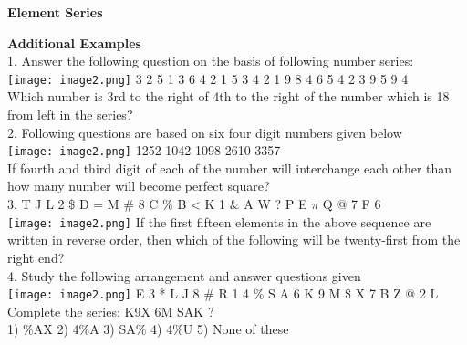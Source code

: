 \documentclass[
]{article}
\author{}
\date{}
\begin{document}
	
 

\begin{center}
	{\Large \textbf{ Element Series\\}}
\end{center}

\textbf{Additional Examples}\\

1. Answer the following question on the basis of following number series:\\
\texttt{[image: image2.png]}
3 2 5 1 3 6 4 2 1 5 3 4 2 1 9 8 4 6 5 4 2 3 9 5 9 4\\
Which number is 3rd to the right of 4th to the right of the number which is 18 from left in the series?\\

2. Following questions are based on six four digit numbers given below\\
\texttt{[image: image2.png]}
1252 1042 1098 2610 3357\\
If fourth and third digit of each of the number will interchange each other than how many number will become perfect square?\\

3. T J L 2 \$ D = M \# 8 C \% B < K 1 \& A W ? P E $\pi$ Q @ 7 F 6\\
\texttt{[image: image2.png]}
If the first fifteen elements in the above sequence are written in reverse order, then which of the following will be twenty-first from the right end?\\

4. Study the following arrangement and answer questions given\\
\texttt{[image: image2.png]}
E 3 * L J 8 \# R 1 4 \% S A \delta \hspace{1mm} 6\hspace{1mm} K\hspace{1mm} 9\hspace{1mm} M\hspace{1mm} \$\hspace{1mm} X\hspace{1mm} 7\hspace{1mm} \beta \hspace{1mm}B\hspace{1mm} Z\hspace{1mm} @\hspace{1mm} 2\hspace{1mm} L\\
Complete the series: K9X\hspace{1mm} \delta6M\hspace{1mm} SAK ?\\
1) \%AX \hspace{2mm}2) 4\%A \hspace{2mm}3) SA\% \hspace{2mm}4) 4\%U \hspace{2mm}5) None of these\\
\end{document}

